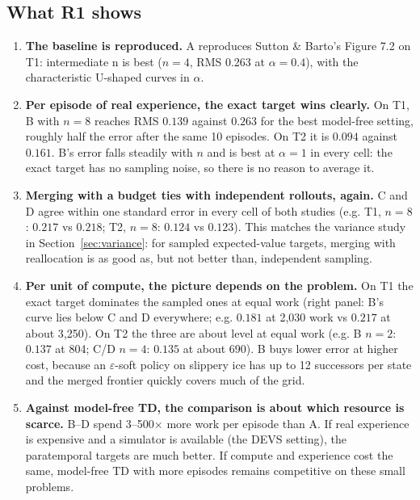 \subsection{What R1 shows}
\begin{enumerate}
\item \textbf{The baseline is reproduced.} A reproduces Sutton \& Barto's Figure 7.2 on T1: intermediate n is best
  ($n=4$, RMS 0.263 at $\alpha=0.4$), with the characteristic U-shaped curves in $\alpha$.
\item \textbf{Per episode of real experience, the exact target wins clearly.} On T1, B with $n=8$ reaches RMS
  $0.139$ against $0.263$ for the best model-free setting, roughly half the error after the same 10 episodes. On T2 it is
  $0.094$ against $0.161$. B's error falls steadily with $n$ and is best at $\alpha=1$ in every cell: the exact target
  has no sampling noise, so there is no reason to average it.
\item \textbf{Merging with a budget ties with independent rollouts, again.} C and D agree within one standard error in
  every cell of both studies (e.g. T1, $n=8$: $0.217$ vs $0.218$; T2, $n=8$: $0.124$ vs $0.123$). This matches the
  variance study in Section~\ref{sec:variance}: for sampled expected-value targets, merging with reallocation is as
  good as, but not better than, independent sampling.
\item \textbf{Per unit of compute, the picture depends on the problem.} On T1 the exact target dominates the sampled ones
  at equal work (right panel: B's curve lies below C and D everywhere; e.g. $0.181$ at 2{,}030 work vs $0.217$ at about
  3{,}250). On T2 the three are about level at equal work (e.g. B $n=2$: $0.137$ at 804; C/D $n=4$: $0.135$ at about
  690). B buys lower error at higher cost, because an $\varepsilon$-soft policy on slippery ice has up to 12 successors per
  state and the merged frontier quickly covers much of the grid.
\item \textbf{Against model-free TD, the comparison is about which resource is scarce.} B--D spend 3--500$\times$ more work
  per episode than A. If real experience is expensive and a simulator is available (the DEVS setting), the paratemporal
  targets are much better. If compute and experience cost the same, model-free TD with more episodes remains
  competitive on these small problems.
\end{enumerate}

